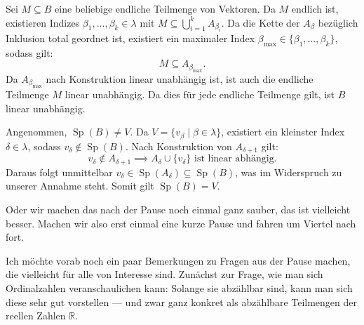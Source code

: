 \begin{math-stroke}

\begin{short-proof}
Sei $M \subseteq B$ eine beliebige endliche Teilmenge von Vektoren. Da $M$ endlich ist, existieren Indizes $\beta_1, \dots, \beta_k \in \lambda$ mit $M \subseteq \bigcup_{i=1}^k A_{\beta_i}$. Da die Kette der $A_\beta$ bezüglich Inklusion total geordnet ist, existiert ein maximaler Index $\beta_{\max} \in \{\beta_1, \dots, \beta_k\}$, sodass gilt:
\[
M \subseteq A_{\beta_{\max}}.
\]
Da $A_{\beta_{\max}}$ nach Konstruktion linear unabhängig ist, ist auch die endliche Teilmenge $M$ linear unabhängig. Da dies für jede endliche Teilmenge gilt, ist $B$ linear unabhängig.
\end{short-proof}

\par\vspace{1ex}\noindent
{}

\begin{short-proof}
Angenommen, $\operatorname{Sp}(B) \neq V$. Da $V = \{v_\beta \mid \beta \in \lambda\}$, existiert ein kleinster Index $\delta \in \lambda$, sodass $v_\delta \notin \operatorname{Sp}(B)$.
Nach Konstruktion von $A_{\delta+1}$ gilt:
\[
v_\delta \notin A_{\delta+1} \implies A_{\delta} \cup \{v_\delta\} \text{ ist linear abhängig}.
\]
Daraus folgt unmittelbar $v_\delta \in \operatorname{Sp}(A_\delta) \subseteq \operatorname{Sp}(B)$, was im Widerspruch zu unserer Annahme steht. Somit gilt $\operatorname{Sp}(B) = V$.
\end{short-proof}
\end{math-stroke}

\begin{spoken-clean}[00:49:55 - 00:52:10]
Oder wir machen das nach der Pause noch einmal ganz sauber, das ist vielleicht besser. Machen wir also erst einmal eine kurze Pause und fahren um Viertel nach fort.

Ich möchte vorab noch ein paar Bemerkungen zu Fragen aus der Pause machen, die vielleicht für alle von Interesse sind. Zunächst zur Frage, wie man sich Ordinalzahlen veranschaulichen kann: Solange sie abzählbar sind, kann man sich diese sehr gut vorstellen --- und zwar ganz konkret als abzählbare Teilmengen der reellen Zahlen $\mathbb{R}$.
\end{spoken-clean}

